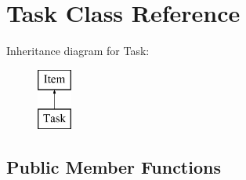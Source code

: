 \hypertarget{class_task}{}\section{Task Class Reference}
\label{class_task}
Inheritance diagram for Task\+:\begin{figure}[H]
\begin{center}
\leavevmode
\includegraphics[height=2.000000cm]{class_task}
\end{center}
\end{figure}
\subsection*{Public Member Functions}
